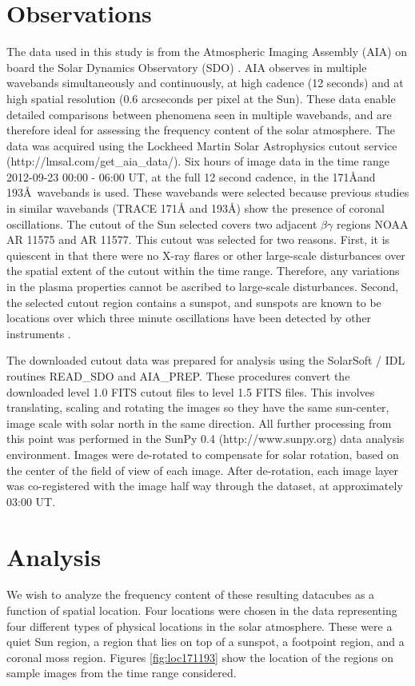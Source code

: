 \documentclass{aastex}
\begin{document}
\section{Observations}\label{sec:obs}
The data used in this study is from the Atmospheric Imaging Assembly
(AIA) \cite{2012SoPh..275...17L} on board the Solar Dynamics
Observatory (SDO) \cite{2012SoPh..275....3P}.  AIA observes in
multiple wavebands simultaneously and continuously, at high cadence
(12 seconds) and at high spatial resolution (0.6 arcseconds per pixel
at the Sun).  These data enable detailed comparisons between phenomena
seen in multiple wavebands, and are therefore ideal for assessing the
frequency content of the solar atmosphere.  The data was acquired
using the Lockheed Martin Solar Astrophysics cutout service
(http://lmsal.com/get\_aia\_data/).  Six hours of image data in the
time range 2012-09-23 00:00 - 06:00 UT, at the full 12 second cadence,
in the 171\AA and 193\AA\ wavebands is used.  These wavebands were
selected because previous studies in similar wavebands (TRACE 171\AA
and 193\AA) show the presence of coronal oscillations.  The cutout of
the Sun selected covers two adjacent $\beta\gamma$ regions NOAA AR
11575 and AR 11577.  This cutout was selected for two reasons.  First,
it is quiescent in that there were no X-ray flares or other
large-scale disturbances over the spatial extent of the cutout within
the time range.  Therefore, any variations in the plasma properties
cannot be ascribed to large-scale disturbances.  Second, the selected
cutout region contains a sunspot, and sunspots are known to be
locations over which three minute oscillations have been detected by
other instruments \citep{2002A&A...387L..13D}.

The downloaded cutout data was prepared for analysis using the
SolarSoft / IDL routines READ\_SDO and AIA\_PREP.  These procedures
convert the downloaded level 1.0 FITS cutout files to level 1.5 FITS
files.  This involves translating, scaling and rotating the images so
they have the same sun-center, image scale with solar north in the
same direction.  All further processing from this point was performed
in the SunPy 0.4 (http://www.sunpy.org) data analysis environment.
Images were de-rotated to compensate for solar rotation, based on the
center of the field of view of each image.  After de-rotation, each
image layer was co-registered with the image half way through the
dataset, at approximately 03:00 UT.

\section{Analysis}\label{sec:anal}
We wish to analyze the frequency content of these resulting datacubes
as a function of spatial location.  Four locations were chosen in the
data representing four different types of physical locations in the
solar atmosphere.  These were a quiet Sun region, a region that lies
on top of a sunspot, a footpoint region, and a coronal moss region.
Figures \ref{fig:loc171193} show the location of the regions on sample
images from the time range considered.
\end{document}
